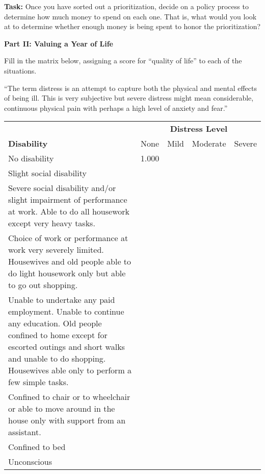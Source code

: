 \bigskip

{\bf Task:}   Once you have sorted out a prioritization, decide on a
policy process to determine how much money to spend on each one.  That
is, what would you look at to determine whether enough money is being
spent to honor the prioritization?




\newpage

\centerline{\bf Part II: Valuing a Year of Life}

\bigskip



\noindent Fill in the matrix below, assigning a score for ``quality of life'' to each of the situations.   
\medskip

``The term distress is an attempt to capture both the physical and mental effects of being ill.  This is very subjective but severe distress might mean considerable, continuous physical pain with perhaps a high level of anxiety and fear.''

\bigskip


\begin{center}
\begin{tabular}{|p{2in}|c|c|c|c|}\hline
 & \multicolumn{4}{c|}{\bf Distress Level}\\
{\bf Disability} & None & Mild & Moderate & Severe\\\hline
No disability & 1.000 & & &  \\\hline
Slight social disability &  & & & \\\hline
Severe social disability and/or slight impairment of performance at work.  Able to do all housework except very heavy tasks. & & & &  \\\hline
Choice of work or performance at work very severely limited.  Housewives and old people able to do light housework only but able to go out shopping. & & & & \\\hline
Unable to undertake any paid employment. Unable to continue any education.  Old people confined to home except for escorted outings and short walks and unable to do shopping.  Housewives able only to perform a few simple tasks. & & & & \\\hline
Confined to chair or to wheelchair or able to move around in the house only with support from an assistant. & & & & \\\hline
Confined to bed & & & & \\\hline
Unconscious & & & & \\\hline
\end{tabular}
\end{center}

